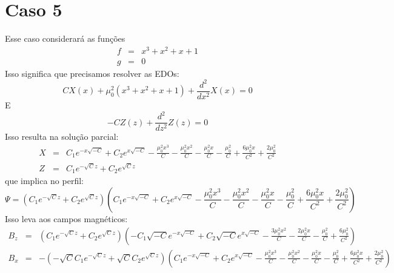 \documentclass[12pt]{article}
\def\be{\begin{equation}}
\def\ee{\end{equation}}
\def\bea{\begin{eqnarray*}}
\def\eea{\end{eqnarray*}}
\theoremstyle{definition}
\numberwithin{equation}{section}
\begin{document}
        \section{Caso 5}
        Esse caso considerará as funções
        \bea
            f &=& x^{3} + x^{2} + x + 1 \\
            g &=& 0
        \eea
        Isso significa que precisamos resolver as EDOs:
        \be
            C X{\left(x \right)} + \mu_{0}^{2} \left(x^{3} + x^{2} + x + 1\right) + \frac{d^{2}}{d x^{2}} X{\left(x \right)} = 0
        \ee
        E
        \be
            - C Z{\left(z \right)} + \frac{d^{2}}{d z^{2}} Z{\left(z \right)} = 0
        \ee
        Isso resulta na solução parcial:
        \bea
            X &=& C_{1} e^{- x \sqrt{- C}} + C_{2} e^{x \sqrt{- C}} - \frac{\mu_{0}^{2} x^{3}}{C} - \frac{\mu_{0}^{2} x^{2}}{C} - \frac{\mu_{0}^{2} x}{C} - \frac{\mu_{0}^{2}}{C} + \frac{6 \mu_{0}^{2} x}{C^{2}} + \frac{2 \mu_{0}^{2}}{C^{2}} \\
            Z &=& C_{1} e^{- \sqrt{C} z} + C_{2} e^{\sqrt{C} z}
        \eea
        que implica no perfil:
        \be
            \Psi = \left(C_{1} e^{- \sqrt{C} z} + C_{2} e^{\sqrt{C} z}\right) \left(C_{1} e^{- x \sqrt{- C}} + C_{2} e^{x \sqrt{- C}} - \frac{\mu_{0}^{2} x^{3}}{C} - \frac{\mu_{0}^{2} x^{2}}{C} - \frac{\mu_{0}^{2} x}{C} - \frac{\mu_{0}^{2}}{C} + \frac{6 \mu_{0}^{2} x}{C^{2}} + \frac{2 \mu_{0}^{2}}{C^{2}}\right)
        \ee
        Isso leva aos campos magnéticos:
        \bea
            B_z &=& \left(C_{1} e^{- \sqrt{C} z} + C_{2} e^{\sqrt{C} z}\right) \left(- C_{1} \sqrt{- C} e^{- x \sqrt{- C}} + C_{2} \sqrt{- C} e^{x \sqrt{- C}} - \frac{3 \mu_{0}^{2} x^{2}}{C} - \frac{2 \mu_{0}^{2} x}{C} - \frac{\mu_{0}^{2}}{C} + \frac{6 \mu_{0}^{2}}{C^{2}}\right)\\
            B_x &=& - \left(- \sqrt{C} C_{1} e^{- \sqrt{C} z} + \sqrt{C} C_{2} e^{\sqrt{C} z}\right) \left(C_{1} e^{- x \sqrt{- C}} + C_{2} e^{x \sqrt{- C}} - \frac{\mu_{0}^{2} x^{3}}{C} - \frac{\mu_{0}^{2} x^{2}}{C} - \frac{\mu_{0}^{2} x}{C} - \frac{\mu_{0}^{2}}{C} + \frac{6 \mu_{0}^{2} x}{C^{2}} + \frac{2 \mu_{0}^{2}}{C^{2}}\right)
        \eea
        
\end{document}
